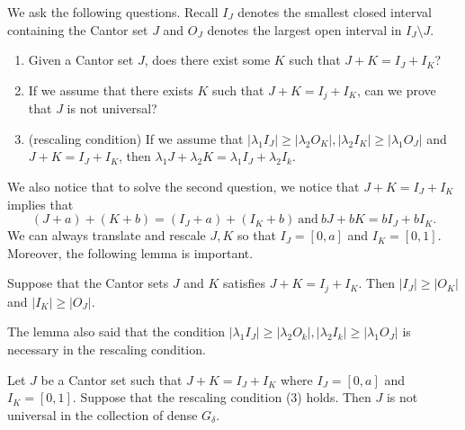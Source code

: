 
We ask the following questions. Recall $I_J$ denotes the smallest closed interval containing the Cantor set $J$ and $O_J$ denotes  the largest open interval in $I_J\setminus J$. 


\begin{enumerate}
    \item Given a Cantor set $J$, does there exist some $K$ such that $J+K = I_J + I_K$?
    \item If we assume that there exists $K$ such that  $J +K = I_j + I_K$, can we prove that $J$ is not universal?
    \item (rescaling condition) If we assume that $|\lambda_1 I_J| \geq |\lambda_2 O_K|, |\lambda_2 I_K| \geq |\lambda_1 O_J|$ and  $J +K = I_J + I_K $, then $ \lambda_1 J + \lambda_2 K = \lambda_1 I_J + \lambda_2 I_k$.
\end{enumerate}

We also notice that to solve the second question, we notice that $J+K = I_J+I_K$ implies that 
$$
(J+a)+(K+b) = (I_J+a)+(I_K+b) \ \mbox{and} \  bJ+bK = bI_J+bI_K.
$$
We can always translate and rescale $J,K$ so that $I_J = [0,a]$ and $I_K = [0,1]$. Moreover, the following lemma is important. 

\begin{lemma}\label{lemma_gap}
Suppose that the Cantor sets $J$ and $K$ satisfies $J +K = I_j + I_K$. Then $|I_J| \ge |O_K|$ and $|I_K|\ge |O_J|$.
\end{lemma}

\medskip

The lemma also said that  the condition $|\lambda_1 I_J| \geq |\lambda_2O_k|, |\lambda_2 I_k| \geq |\lambda_1 O_J|$ is necessary in the rescaling  condition. 

\medskip

\begin{proposition}
Let $J$ be a Cantor set such that $J+K = I_J+I_K$ where $I_J = [0,a]$ and $I_K = [0,1]$. Suppose that the rescaling condition (3) holds. Then $J$ is not universal in the collection of dense $G_{\delta}$. 
\end{proposition}

